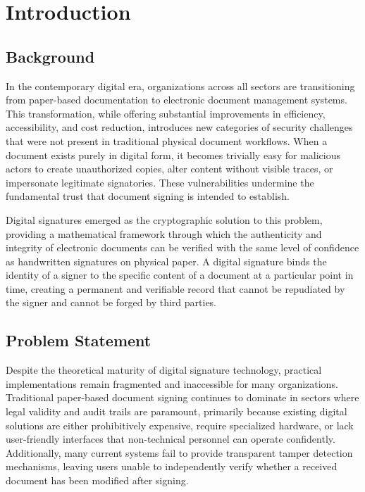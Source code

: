 \chapter{Introduction}

\section{Background}

In the contemporary digital era, organizations across all sectors are transitioning from paper-based documentation to electronic document management systems. This transformation, while offering substantial improvements in efficiency, accessibility, and cost reduction, introduces new categories of security challenges that were not present in traditional physical document workflows. When a document exists purely in digital form, it becomes trivially easy for malicious actors to create unauthorized copies, alter content without visible traces, or impersonate legitimate signatories. These vulnerabilities undermine the fundamental trust that document signing is intended to establish.

Digital signatures emerged as the cryptographic solution to this problem, providing a mathematical framework through which the authenticity and integrity of electronic documents can be verified with the same level of confidence as handwritten signatures on physical paper. A digital signature binds the identity of a signer to the specific content of a document at a particular point in time, creating a permanent and verifiable record that cannot be repudiated by the signer and cannot be forged by third parties.

\section{Problem Statement}

Despite the theoretical maturity of digital signature technology, practical implementations remain fragmented and inaccessible for many organizations. Traditional paper-based document signing continues to dominate in sectors where legal validity and audit trails are paramount, primarily because existing digital solutions are either prohibitively expensive, require specialized hardware, or lack user-friendly interfaces that non-technical personnel can operate confidently. Additionally, many current systems fail to provide transparent tamper detection mechanisms, leaving users unable to independently verify whether a received document has been modified after signing.

